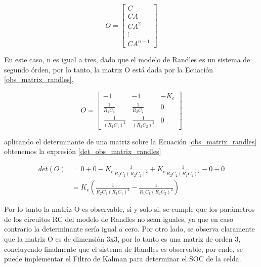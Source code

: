 \documentclass[10pt,a4paper]{article}
\begin{document}
\begin{equation}
    O = \begin{bmatrix}
        C\\
        CA\\
        CA^2\\
        \vdots\\
        CA^{n-1}
        \end{bmatrix}\label{observation_matrix}
\end{equation}

En este caso, n es igual a tres, dado que el modelo de Randles es un sistema de 
segundo \'orden, por lo tanto, la matriz O est\'a dada por la Ecuaci\'on 
\ref{obs_matrix_randles},

\begin{equation}
    O = \begin{bmatrix}
        -1 & -1 & -K_e \\
        \frac{1}{R_1C_1} & \frac{1}{R_2C_2} & 0 \\
        \frac{1}{\left(R_1C_1\right)^2} & \frac{1}{\left(R_2C_2\right)^2} & 0
        \end{bmatrix}\label{obs_matrix_randles}
\end{equation}

aplicando el determinante de una matriz sobre la Ecuaci\'on
\ref{obs_matrix_randles} obtenemos la expresi\'on \ref{det_obs_matrix_randles}

\begin{align}
    det\left(O\right) &= 0 + 0 -K_e \frac{1}{R_1C_1\left(R_2C_2\right)^2} + 
                        K_e \frac{1}{R_2C_2\left(R_1C_1\right)^2} - 0 -
                        0\nonumber\\
                      &= K_e \left(\frac{1}{R_2C_2\left(R_1C_1\right)^2} - 
                                   \frac{1}{R_1C_1\left(R_2C_2\right)^2}\right)
                                   \label{det_obs_matrix_randles}
\end{align}

Por lo tanto la matriz O es observable, si y solo si, se cumple que los
par\'ametros de los circuitos RC del modelo de Randles no sean iguales, ya que
en caso contrario la determinante ser\'ia igual a cero. Por otro lado, se observa
claramente que la matriz O es de dimensi\'on 3x3, por lo tanto es una matriz de
orden 3, concluyendo finalmente que el sistema de Randles es observable, por 
ende, se puede implementar el Filtro de Kalman para determinar el \acrshort{SOC} 
de la celda.
\end{document}
